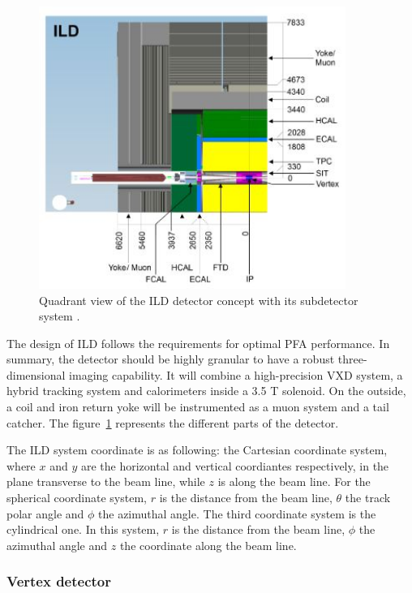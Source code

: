     \begin{figure}[!h]
      \centering
      \includegraphics[width = 10cm]{Pictures/ILC/fig_ILD_Quadrant.png}
      \caption{Quadrant view of the ILD detector concept with its subdetector system \cite{Behnke2010}.}
      \label{fig:ILD_quadrant}
    \end{figure}

    The design of \gls{ILD} follows the requirements for optimal \gls{PFA} performance.
    In summary, the detector should be highly granular to have a robust three-dimensional imaging capability.
    It will combine a high-precision \acrfull{VXD} system, a hybrid tracking system and calorimeters inside a 3.5 T solenoid. 
    On the outside, a coil and iron return yoke will be instrumented as a muon system and a tail catcher.
    The figure~\ref{fig:ILD_quadrant} represents the different parts of the detector.

    The \gls{ILD} system coordinate is as following: the Cartesian coordinate system, where $x$ and $y$ are the horizontal and vertical coordiantes respectively, in the plane transverse to the beam line, while $z$ is along the beam line.
    For the spherical coordinate system, $r$ is the distance from the beam line, $\theta$ the track polar angle and $\phi$ the azimuthal angle.
    The third coordinate system is the cylindrical one.
    In this system, $r$ is the distance from the beam line, $\phi$ the azimuthal angle and $z$ the coordinate along the beam line.

      \subsubsection{Vertex detector}

